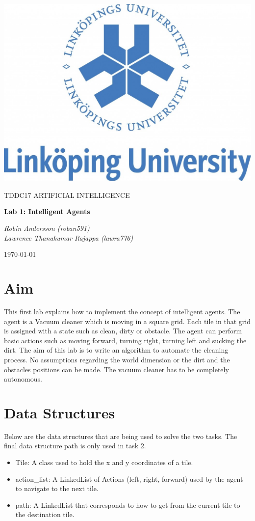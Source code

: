 \documentclass[a4paper,10pt]{article}
\begin{document}
\begin{titlepage}
	\centering
	\includegraphics[width=.6\textwidth]{liu-logo.png}\par
	\vfill
	{\scshape\Large TDDC17 ARTIFICIAL INTELLIGENCE\par}
	{\huge\bfseries Lab 1: Intelligent Agents\par}
	\vspace{1cm}
	{\large\itshape Robin Andersson (roban591) \\ Lawrence Thanakumar Rajappa (lawra776)\par}
	\vfill
	{\large \today\par}
\end{titlepage}

\section{Aim}

This first lab explains how to implement the concept of intelligent agents. 
The agent is a Vacuum cleaner which is moving in a square grid. 
Each tile in that grid is assigned with a state such as clean, dirty or obstacle. 
The agent can perform basic actions such as moving forward, turning right, turning left and sucking the dirt. 
The aim of this lab is to write an algorithm to automate the cleaning process. 
No assumptions regarding the world dimension or the dirt and the obstacles positions can be made. 
The vacuum cleaner has to be completely autonomous.

\section{Data Structures}

Below are the data structures that are being used to solve the two tasks.
The final data structure path is only used in task 2.

\begin{itemize}
	\item Tile: A class used to hold the x and y coordinates of a tile.
	\item action\_list: A LinkedList of Actions (left, right, forward) used by the agent to navigate to the next tile.
	\item path: A LinkedList that corresponds to how to get from the current tile to the destination tile.
\end{itemize}
\end{document}
